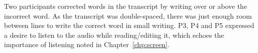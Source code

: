Two participants corrected words in the transcript by writing over or above the incorrect word. As the transcript was
double-spaced, there was just enough room between lines to write the correct word in small writing.
P3, P4 and P5 expressed a desire to listen to the audio while reading/editing it, which echoes the importance of
listening noted in Chapter~\ref{chp:screen}.















